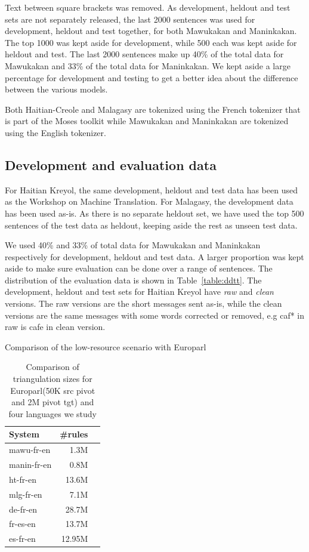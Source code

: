     Text between square brackets was removed. As development, heldout and test sets are not separately released, the last 2000 sentences was used for development, heldout and test together, for both Mawukakan and Maninkakan. The top 1000 was kept aside for development, while 500 each was kept aside for heldout and test. The last 2000 sentences make up 40\% of the total data for Mawukakan and 33\% of the total data for Maninkakan. We kept aside a large percentage for development and testing to get a better idea about the difference between the various models.

    Both Haitian-Creole and Malagasy are tokenized using the French tokenizer that is part of the Moses toolkit while Mawukakan and Maninkakan are tokenized using the English tokenizer.

\subsection{Development and evaluation data}
	For Haitian Kreyol, the same development, heldout and test data has been used as the Workshop on Machine Translation. For Malagasy, the development data has been used as-is. As there is no separate heldout set, we have used the top 500 sentences of the test data as heldout, keeping aside the rest as unseen test data. 

	We used 40\% and 33\% of total data for Mawukakan and Maninkakan respectively for development, heldout and test data. A larger proportion was kept aside to make sure evaluation can be done over a range of sentences. The distribution of the evaluation data is shown in Table~\ref{table:ddtt}. The development, heldout and test sets for Haitian Kreyol have \emph{raw} and \emph{clean} versions. The raw versions are the short messages sent as-is, while the clean versions are the same messages with some words corrected or removed, e.g caf* in raw is cafe in clean version. 


\begin{table}
	\small
	\centering
	
	\caption{Comparison of the low-resource scenario with Europarl}
	\label{table:datasettings}
\end{table}



\begin{table}
	\small
	\centering
	\begin{tabular}{lrr}
	\toprule
	System & \#rules \\
	\toprule
	mawu-fr-en  & 1.3M \\
	manin-fr-en  & 0.8M \\
	ht-fr-en  & 13.6M \\
	mlg-fr-en & 7.1M \\
	\midrule
	de-fr-en  & 28.7M \\
	fr-es-en  & 13.7M \\
	es-fr-en  & 12.95M \\
	\bottomrule
	\end{tabular}
	\caption{Comparison of triangulation sizes for Europarl(50K src pivot and 2M pivot tgt) and four languages we study}
	\label{table:triangulation_numbers}
\end{table}

